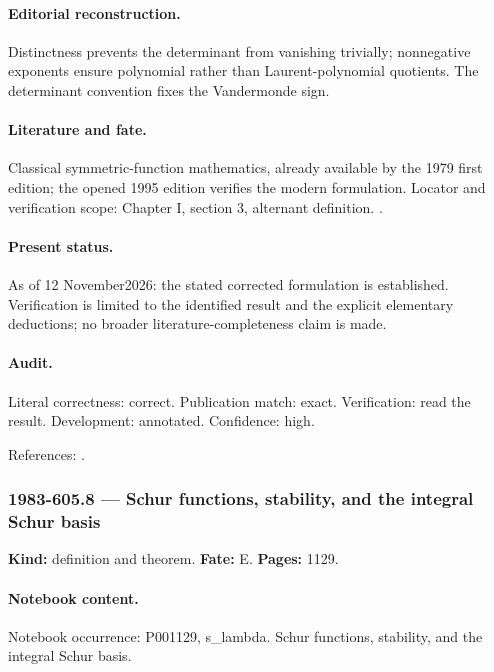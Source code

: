\paragraph{Editorial reconstruction.} Distinctness prevents the determinant from vanishing trivially; nonnegative exponents ensure polynomial rather than Laurent-polynomial quotients. The determinant convention fixes the Vandermonde sign.

\paragraph{Literature and fate.} Classical symmetric-function mathematics, already available by the 1979 first edition; the opened 1995 edition verifies the modern formulation. Locator and verification scope: Chapter I, section 3, alternant definition. \cite{macdonald1995symmetric}.

\paragraph{Present status.} As of 12 November2026: the stated corrected formulation is established. Verification is limited to the identified result and the explicit elementary deductions; no broader literature-completeness claim is made.

\paragraph{Audit.} Literal correctness: correct. Publication match: exact. Verification: read the result. Development: annotated. Confidence: high.

\noindent References: \citep{macdonald1995symmetric}.\par

\subsubsection{1983-605.8 --- Schur functions, stability, and the integral Schur basis}

\label{item:1983-605.8}

\noindent\textbf{Kind:} definition and theorem. \textbf{Fate:} E. \textbf{Pages:} 1129.\par

\paragraph{Notebook content.} Notebook occurrence: P001129, s_lambda. Schur functions, stability, and the integral Schur basis.

